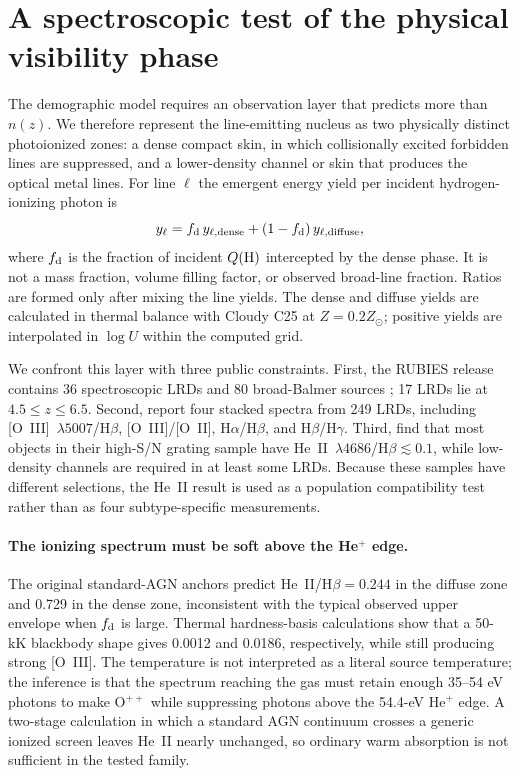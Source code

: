 
\section{A spectroscopic test of the physical visibility phase}
\label{sec:spectral_visibility}

The demographic model requires an observation layer that predicts more than
$n(z)$. We therefore represent the line-emitting nucleus as two physically
distinct photoionized zones: a dense compact skin, in which collisionally
excited forbidden lines are suppressed, and a lower-density channel or skin
that produces the optical metal lines. For line $\ell$ the emergent energy
yield per incident hydrogen-ionizing photon is
\begin{equation}
 y_\ell=f_{\rm d}\,y_{\ell,{\rm dense}}
 +(1-f_{\rm d})\,y_{\ell,{\rm diffuse}},
\end{equation}
where $f_{\rm d}$ is the fraction of incident $Q({\rm H})$ intercepted by the
dense phase. It is not a mass fraction, volume filling factor, or observed
broad-line fraction. Ratios are formed only after mixing the line yields.
The dense and diffuse yields are calculated in thermal balance with Cloudy
C25 at $Z=0.2Z_\odot$; positive yields are interpolated in $\log U$ within the
computed grid.

We confront this layer with three public constraints. First, the RUBIES
release contains 36 spectroscopic LRDs and 80 broad-Balmer sources
\citep{hviding2025}; 17 LRDs lie at $4.5\le z\le6.5$. Second,
\citet{perezgonzalez2026} report four stacked spectra from 249 LRDs, including
[O~III]~$\lambda5007$/H$\beta$, [O~III]/[O~II], H$\alpha$/H$\beta$, and
H$\beta$/H$\gamma$. Third, \citet{sok2026} find that most objects in their
high-S/N grating sample have He~II~$\lambda4686$/H$\beta\lesssim0.1$, while
low-density channels are required in at least some LRDs. Because these samples
have different selections, the He~II result is used as a population
compatibility test rather than as four subtype-specific measurements.

\paragraph{The ionizing spectrum must be soft above the He$^+$ edge.}
The original standard-AGN anchors predict He~II/H$\beta=0.244$ in the diffuse
zone and 0.729 in the dense zone, inconsistent with the typical observed
upper envelope when $f_{\rm d}$ is large. Thermal hardness-basis calculations
show that a 50-kK blackbody shape gives 0.0012 and 0.0186, respectively, while
still producing strong [O~III]. The temperature is not interpreted as a
literal source temperature; the inference is that the spectrum reaching the
gas must retain enough 35--54 eV photons to make O$^{++}$ while suppressing
photons above the 54.4-eV He$^+$ edge. A two-stage calculation in which a
standard AGN continuum crosses a generic ionized screen leaves He~II nearly
unchanged, so ordinary warm absorption is not sufficient in the tested
family.

